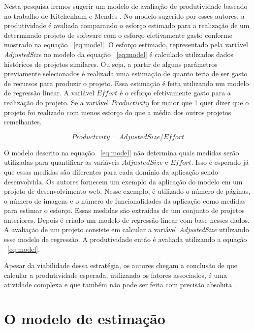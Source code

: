  Nesta pesquisa iremos sugerir um modelo de avaliação de produtividade baseado no trabalho de  Kitchenham e Mendes \cite{kitchenham2004software}. No modelo sugerido por esses autores, a produtividade é avaliada comparando o esforço estimado para a realização de um determinado projeto de software com o esforço efetivamente gasto conforme mostrado na equação ~\ref{eq:model}. O esforço estimado, representado pela variável \textit{AdjustedSize} no modelo da equação ~\ref{eq:model} é calculado utilizados dados históricos de projetos similares. Ou seja, a partir de alguns parâmetros previamente selecionados é realizada uma estimação de quanto teria de ser gasto de recursos para produzir o projeto. Essa estimação é feita utilizando um modelo de regressão linear.  A variável $Effort$ é o esforço efetivamente gasto para a realização do projeto. Se a variável $Productivity$ for maior que 1 quer dizer que o projeto foi realizado com menos esforço do que a média dos outros projetos semelhantes.
 
 
 

\begin{equation}
\label{eq:model}
  Productivity = AdjustedSize/Effort
\end{equation}


O modelo descrito na equação ~\ref{eq:model} não determina quais medidas serão utilizadas para quantificar as variáveis $AdjustedSize$ e $Effort$. Isso é esperado já que essas medidas são diferentes para cada domínio da aplicação sendo desenvolvida. Os autores fornecem um exemplo da aplicação do modelo em um projeto de desenvolvimento web. Nesse exemplo, é utilizado o número de páginas, o número de imagens e o número de funcionalidades da aplicação como medidas para estimar o esforço. Essas medidas são extraídas de um conjunto de projetos anteriores. Depois é criado um modelo de regressão linear com base nesses dados. A avaliação de um projeto consiste em calcular a variável \textit{AdjustedSize} utilizando esse modelo de regressão. A produtividade então é avaliada utilizando a equação ~\ref{eq:model}.

Apesar da viabilidade dessa estratégia, os autores  chegam a conclusão de que calcular a produtividade esperada, utilizando os  fatores associados, é uma atividade complexa e que também não pode ser feita com precisão absoluta \cite{petersen2011measuring}.


\section{O modelo de estimação}

